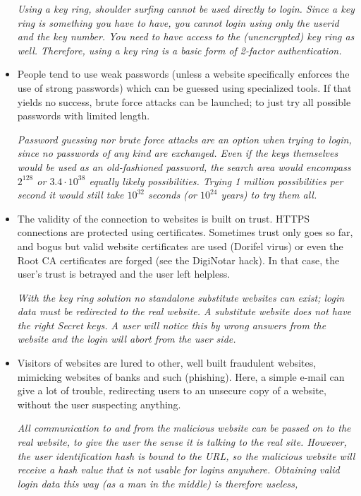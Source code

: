 \begin{itemize}
\par
\emph{Using a key ring,
shoulder surfing cannot be used directly to login.
Since a key ring is something you have to have,
you cannot login using only the userid and the key number.
You need to have access to the
(unencrypted)
key ring as well.
Therefore,
using a key ring is a basic form of 2-factor authentication.}
\item People tend to use weak passwords
(unless a website specifically enforces the use of strong passwords)
which can be guessed using specialized tools.
If that yields no success,
brute force attacks can be launched; to just try all possible passwords with limited length.
\par
\emph{Password guessing nor brute force attacks are an option when trying to login,
since no passwords of any kind are exchanged.
Even if the keys themselves would be used as an old-fashioned password,
the search area would encompass $2^{128}$ or $3.4\cdot 10^{38}$ equally likely possibilities.
Trying 1 million possibilities per second it would still take $10^{32}$ seconds
(or $10^{24}$ years)
to try them all.}
\item The validity of the connection to websites is built on trust.
HTTPS connections are protected using certificates.
Sometimes trust only goes so far,
and bogus but valid website certificates are used
(Dorifel virus)
or even the Root CA certificates are forged
(see the DigiNotar hack).
In that case,
the user's trust is betrayed and the user left helpless.
\par
\emph{With the key ring solution no standalone substitute websites can exist;
login data must be redirected to the real website.
A substitute website does not have the right Secret keys.
A user will notice this by wrong answers from the website and the login will abort from the user side.}
\item Visitors of websites are lured to other,
well built fraudulent websites,
mimicking websites of banks and such
(phishing).
Here,
a simple e-mail can give a lot of trouble,
redirecting users to an unsecure copy of a website,
without the user suspecting anything.
\par
\emph{All communication to and from the malicious website can be passed on to the real website,
to give the user the sense it is talking to the real site.
However,
the user identification hash is bound to the URL,
so the malicious website will receive a hash value that is not usable for logins anywhere.
Obtaining valid login data this way
(as a man in the middle)
is therefore useless,
}
\end{itemize}
